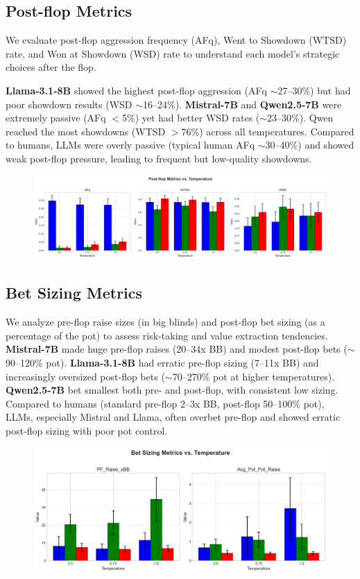 \documentclass{article}
\begin{document}
\subsection{Post-flop Metrics}
We evaluate post-flop aggression frequency (AFq), Went to Showdown (WTSD) rate, and Won at Showdown (WSD) rate to understand each model's strategic choices after the flop.

\textbf{Llama-3.1-8B} showed the highest post-flop aggression (AFq $\sim$27--30\%) but had poor showdown results (WSD $\sim$16--24\%). \textbf{Mistral-7B} and \textbf{Qwen2.5-7B} were extremely passive (AFq $<$5\%) yet had better WSD rates ($\sim$23--30\%). Qwen reached the most showdowns (WTSD $>$76\%) across all temperatures. Compared to humans, LLMs were overly passive (typical human AFq $\sim$30--40\%) and showed weak post-flop pressure, leading to frequent but low-quality showdowns.
\begin{figure}[!htb]
    \centering
    \includegraphics[width=0.8\linewidth]{plots/postflop_trends.png}
\end{figure}


\subsection{Bet Sizing Metrics}
We analyze pre-flop raise sizes (in big blinds) and post-flop bet sizing (as a percentage of the pot) to assess risk-taking and value extraction tendencies.
\textbf{Mistral-7B} made huge pre-flop raises (20--34x BB) and modest post-flop bets ($\sim$90--120\% pot). \textbf{Llama-3.1-8B} had erratic pre-flop sizing (7--11x BB) and increasingly oversized post-flop bets ($\sim$70--270\% pot at higher temperatures). \textbf{Qwen2.5-7B} bet smallest both pre- and post-flop, with consistent low sizing. Compared to humans (standard pre-flop 2--3x BB, post-flop 50--100\% pot), LLMs, especially Mistral and Llama, often overbet pre-flop and showed erratic post-flop sizing with poor pot control.
\begin{figure}[!htb]
    \centering
    \includegraphics[width=0.8\linewidth]{plots/bet_sizing_trends.png}
\end{figure}
\end{document}
